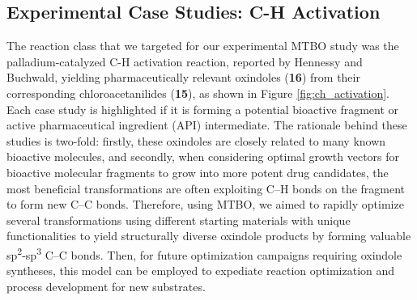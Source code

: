 \subsection{Experimental Case Studies: C-H Activation}

The reaction class that we targeted for our experimental MTBO study was the palladium-catalyzed C-H activation reaction, reported by Hennessy and Buchwald, yielding pharmaceutically relevant oxindoles (\textbf{16}) from their corresponding chloroacetanilides (\textbf{15}), as shown in Figure \ref{fig:ch_activation}. Each case study is highlighted if it is forming a potential bioactive fragment or active pharmaceutical ingredient (API) intermediate. The rationale behind these studies is two-fold: firstly, these oxindoles are closely related to many known bioactive molecules, and secondly, when considering optimal growth vectors for bioactive molecular fragments to grow into more potent drug candidates, the most beneficial transformations are often exploiting C--H bonds on the fragment to form new C--C bonds. Therefore, using MTBO, we aimed to rapidly optimize several transformations using different starting materials with unique functionalities to yield structurally diverse oxindole products by forming valuable sp\textsuperscript{2}-sp\textsuperscript{3} C--C bonds. Then, for future optimization campaigns requiring oxindole syntheses, this model can be employed to expediate reaction optimization and process development for new substrates.

